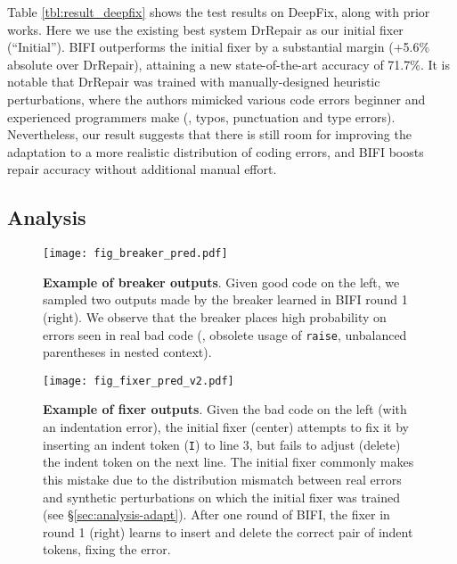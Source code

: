 Table \ref{tbl:result_deepfix} shows the test results on DeepFix, along with prior works.
Here we use the existing best system DrRepair as our initial fixer (``Initial''). BIFI outperforms the initial fixer by a substantial margin (+5.6\% absolute over DrRepair), attaining a new state-of-the-art accuracy of 71.7\%.
It is notable that DrRepair was trained with manually-designed heuristic perturbations, where the authors \cite{yasunaga2020repair} mimicked various code errors beginner and experienced programmers make (\eg, typos, punctuation and type errors). Nevertheless, our result suggests that there is still room for improving the adaptation to a more realistic distribution of coding errors, and BIFI boosts repair accuracy without additional manual effort.



\subsection{Analysis}
\label{sec:analysis}

\begin{figure}[!t]
\hspace{-2mm}
    \texttt{[image: fig\_breaker\_pred.pdf]}\vspace{-7mm}
    \caption{
    \textbf{Example of breaker outputs}. Given good code on the left, we sampled two outputs made by the breaker learned in BIFI round 1 (right). We observe that the breaker places high probability on errors seen in real bad code (\ie, obsolete usage of \texttt{raise}, unbalanced parentheses in nested context).
    } \vspace{-3mm}
  \label{fig:breaker_pred}
\end{figure}

\begin{figure}[!t]
\hspace{-2mm}
    \texttt{[image: fig\_fixer\_pred\_v2.pdf]}\vspace{-7mm}
    \caption{
    \textbf{Example of fixer outputs}. Given the bad code on the left (with an indentation error), the initial fixer (center) attempts to fix it by inserting an indent token (\texttt{I}) to line 3, but fails to adjust (delete) the indent token on the next line. The initial fixer commonly makes this mistake due to the distribution mismatch between real errors and synthetic perturbations on which the initial fixer was trained (see \S \ref{sec:analysis-adapt}). After one round of BIFI, the fixer in round 1 (right) learns to insert and delete the correct pair of indent tokens, fixing the error.
    } \vspace{-2mm}
  \label{fig:fixer_pred}
\end{figure}



